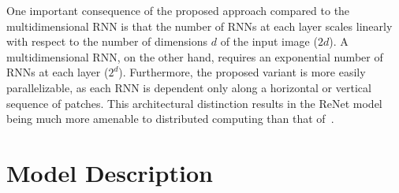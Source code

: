 One important consequence of the proposed approach compared to the
multidimensional RNN is that the number of RNNs at each layer scales linearly
with respect to the number of dimensions $d$ of the input image ($2d$). A
multidimensional RNN, on the other hand, requires an exponential number of RNNs
at each layer ($2^d$). Furthermore, the proposed variant is more easily
parallelizable, as each RNN is dependent only along a horizontal or vertical
sequence of patches. This architectural distinction results in the ReNet model
being much more amenable to distributed computing than that
of~\citet{Graves+Schmidhuber-2009}.


\section{Model Description}\label{sec:renet_model}

